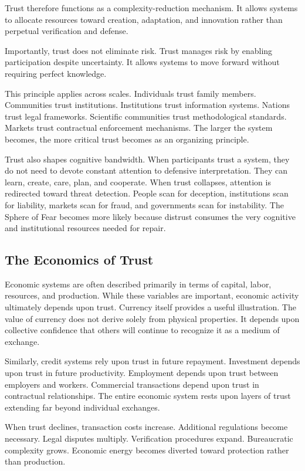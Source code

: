 \documentclass[12pt]{article}
\begin{document}
Trust therefore functions as a complexity-reduction mechanism. It allows systems to allocate resources toward creation, adaptation, and innovation rather than perpetual verification and defense.

Importantly, trust does not eliminate risk. Trust manages risk by enabling participation despite uncertainty. It allows systems to move forward without requiring perfect knowledge.

This principle applies across scales. Individuals trust family members. Communities trust institutions. Institutions trust information systems. Nations trust legal frameworks. Scientific communities trust methodological standards. Markets trust contractual enforcement mechanisms. The larger the system becomes, the more critical trust becomes as an organizing principle.

Trust also shapes cognitive bandwidth. When participants trust a system, they do not need to devote constant attention to defensive interpretation. They can learn, create, care, plan, and cooperate. When trust collapses, attention is redirected toward threat detection. People scan for deception, institutions scan for liability, markets scan for fraud, and governments scan for instability. The Sphere of Fear becomes more likely because distrust consumes the very cognitive and institutional resources needed for repair.

\subsection{The Economics of Trust}

Economic systems are often described primarily in terms of capital, labor, resources, and production. While these variables are important, economic activity ultimately depends upon trust. Currency itself provides a useful illustration. The value of currency does not derive solely from physical properties. It depends upon collective confidence that others will continue to recognize it as a medium of exchange.

Similarly, credit systems rely upon trust in future repayment. Investment depends upon trust in future productivity. Employment depends upon trust between employers and workers. Commercial transactions depend upon trust in contractual relationships. The entire economic system rests upon layers of trust extending far beyond individual exchanges.

When trust declines, transaction costs increase. Additional regulations become necessary. Legal disputes multiply. Verification procedures expand. Bureaucratic complexity grows. Economic energy becomes diverted toward protection rather than production.
\end{document}
